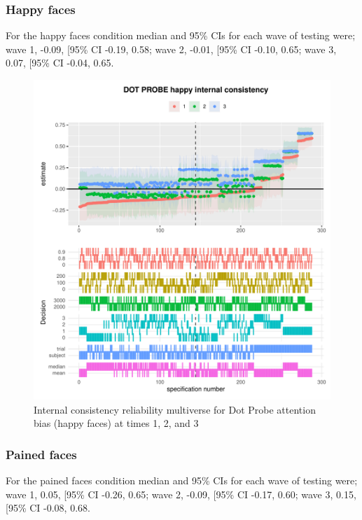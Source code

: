 \documentclass[
  english,
  man,floatsintext]{apa6}
\begin{document}
\newpage

\hypertarget{happy-faces}{%
\subsubsection{Happy faces}\label{happy-faces}}

For the happy faces condition median and 95\% CIs for each wave of testing were; wave 1, -0.09, {[}95\% CI -0.19, 0.58; wave 2, -0.01, {[}95\% CI -0.10, 0.65; wave 3, 0.07, {[}95\% CI -0.04, 0.65.

\begin{figure}
\centering
\includegraphics{Reliability_Multiverse_files/figure-latex/unnamed-chunk-14-1.pdf}
\caption{\label{fig:unnamed-chunk-14}Internal consistency reliability multiverse for Dot Probe attention bias (happy faces) at times 1, 2, and 3}
\end{figure}

\newpage

\hypertarget{pained-faces}{%
\subsubsection{Pained faces}\label{pained-faces}}

For the pained faces condition median and 95\% CIs for each wave of testing were; wave 1, 0.05, {[}95\% CI -0.26, 0.65; wave 2, -0.09, {[}95\% CI -0.17, 0.60; wave 3, 0.15, {[}95\% CI -0.08, 0.68.
\end{document}
